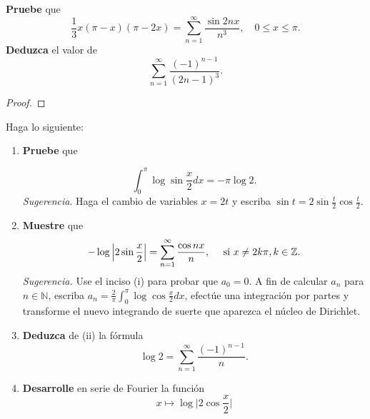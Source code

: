 \documentclass[12pt]{report}
\theoremstyle{largebreak}
\renewcommand{\leq}{\ensuremath{\leqslant}}
\begin{document}
    \begin{excer}
        \textbf{Pruebe} que
        \begin{equation*}
            \frac{1}{3}x(\pi-x)(\pi-2x)=\sum_{ n=1}^\infty\frac{\sin 2nx}{n^3},\quad 0\leq x\leq \pi.
        \end{equation*}
        \textbf{Deduzca} el valor de
        \begin{equation*}
            \sum_{ n=1}^\infty\frac{(-1)^{ n-1}}{(2n-1)^3}.
        \end{equation*}
    \end{excer}

    \begin{proof}
        
    \end{proof}

    \renewcommand{\theenumi}{\textbf{\roman{enumi}}}
    
    \begin{excer}
        Haga lo siguiente:
        \begin{enumerate}
            \item \textbf{Pruebe} que
            
            \begin{equation*}
                \int_0^\pi\log\sin\frac{x}{2}dx=-\pi\log2.
            \end{equation*}
            \textit{Sugerencia}. Haga el cambio de variables $x=2t$ y escriba $\sin t =2\sin\frac{t}{2}\cos\frac{t}{2}$.
            \item \textbf{Muestre} que
            \begin{equation*}
                -\log\Big|2\sin\frac{x}{2}\Big|=\sum_{ n=1}^\infty\frac{\cos nx}{n},\quad\textup{ si }x\neq 2k\pi,k\in\mathbb{Z}.
            \end{equation*}
            \textit{Sugerencia.} Use el inciso (i) para probar que $a_0=0$. A fin de calcular $a_n$ para $n\in\mathbb{N}$, escriba $a_n=\frac{2}{\pi}\int_0^\pi\log\cos\frac{x}{2}dx$, efectúe una integración por partes y transforme el nuevo integrando de suerte que aparezca el núcleo de Dirichlet.
            \item \textbf{Deduzca} de (ii) la fórmula
            \begin{equation*}
                \log2=\sum_{ n=1}^\infty\frac{(-1)^{ n-1}}{n}.
            \end{equation*}
            \item \textbf{Desarrolle} en serie de Fourier la función
            \begin{equation*}
                x\mapsto\log\Big|2\cos\frac{x}{2}\Big|
            \end{equation*}
        \end{enumerate}
    \end{excer}
\end{document}
